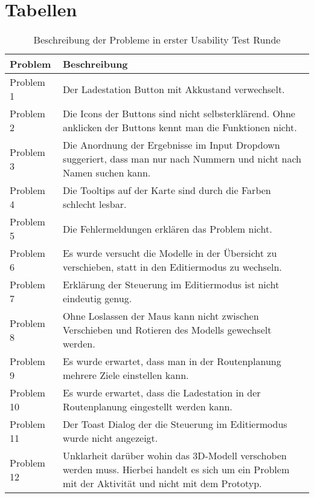 \section{Tabellen}
\begin{table}[H]
    \caption{Beschreibung der Probleme in erster Usability Test Runde}\label{tbl:1stUsabilityTestsProblemsDesc}
    \begin{tabular}{l|l}
        Problem     & Beschreibung \\ \hline
        Problem 1   & \multicolumn{1}{p{12cm}}{Der Ladestation Button mit Akkustand verwechselt.} \\ \hline
        Problem 2   & \multicolumn{1}{p{12cm}}{Die Icons der Buttons sind nicht selbsterklärend. Ohne anklicken der Buttons kennt man die Funktionen nicht.} \\ \hline
        Problem 3   & \multicolumn{1}{p{12cm}}{Die Anordnung der Ergebnisse im Input Dropdown suggeriert, dass man nur nach Nummern und nicht nach Namen suchen kann.} \\ \hline
        Problem 4   & \multicolumn{1}{p{12cm}}{Die Tooltips auf der Karte sind durch die Farben schlecht lesbar.} \\ \hline
        Problem 5   & \multicolumn{1}{p{12cm}}{Die Fehlermeldungen erklären das Problem nicht.} \\ \hline
        Problem 6   & \multicolumn{1}{p{12cm}}{Es wurde versucht die Modelle in der Übersicht zu verschieben, statt in den Editiermodus zu wechseln.} \\ \hline
        Problem 7   & \multicolumn{1}{p{12cm}}{Erklärung der Steuerung im Editiermodus ist nicht eindeutig genug.} \\ \hline
        Problem 8   & \multicolumn{1}{p{12cm}}{Ohne Loslassen der Maus kann nicht zwischen Verschieben und Rotieren des Modells gewechselt werden.} \\ \hline
        Problem 9   & \multicolumn{1}{p{12cm}}{Es wurde erwartet, dass man in der Routenplanung mehrere Ziele einstellen kann.} \\ \hline
        Problem 10  & \multicolumn{1}{p{12cm}}{Es wurde erwartet, dass die Ladestation in der Routenplanung eingestellt werden kann.} \\ \hline
        Problem 11  & \multicolumn{1}{p{12cm}}{Der Toast Dialog der die Steuerung im Editiermodus wurde nicht angezeigt.} \\ \hline
        Problem 12  & \multicolumn{1}{p{12cm}}{Unklarheit darüber wohin das 3D-Modell verschoben werden muss. Hierbei handelt es sich um ein Problem mit der Aktivität und nicht mit dem Prototyp.} \\ \hline

\end{tabular}
\end{table}

